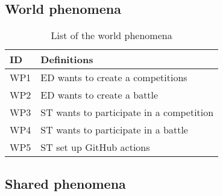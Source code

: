 \subsection{World phenomena}
\label{ss:world_phenomena}%

\begin{table}[H]
  \begin{tabular}{|l|l|}

    \hline
    \textbf{ID} & \textbf{Definitions}      \\
    \hline
    WP1 & ED wants to create a competitions \\
    \hline
    WP2 & ED wants to create a battle \\
    \hline
    WP3 & ST wants to participate in a competition \\
    \hline
    WP4 & ST wants to participate in a battle     \\
    \hline
    WP5 & ST set up GitHub actions    \\
    \hline
    
  \end{tabular}
  \caption{List of the world phenomena}
  \label{tab:worldPhenomena}
\end{table}

\subsection{Shared phenomena}
\label{ss:shared_phenomena}%

